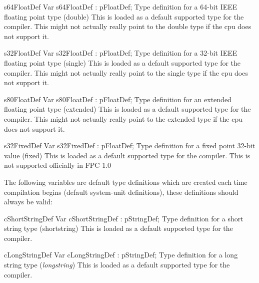 \documentclass [a4paper,12pt]{article}
\begin{document}
\begin{variable}{s64FloatDef}
\Declaration
Var s64FloatDef : pFloatDef;
\Description
Type definition for a 64-bit IEEE floating point type (\textsf{double})
\Notes
This is loaded as a default supported type for the compiler. This might not
actually really point to the double type if the cpu does not support it.
\end{variable}

\begin{variable}{s32FloatDef}
\Declaration
Var s32FloatDef : pFloatDef;
\Description
Type definition for a 32-bit IEEE floating point type (\textsf{single})
\Notes
This is loaded as a default supported type for the compiler. This might not
actually really point to the single type if the cpu does not support it.
\end{variable}

\begin{variable}{s80FloatDef}
\Declaration
Var s80FloatDef : pFloatDef;
\Description
Type definition for an extended floating point type (\textsf{extended})
\Notes
This is loaded as a default supported type for the compiler. This
might not actually really point to the extended type if the cpu does not
support it.
\end{variable}

\begin{variable}{s32FixedDef}
\Declaration
Var s32FixedDef : pFloatDef;
\Description
Type definition for a fixed point 32-bit value (\textsf{fixed})
\Notes
This is loaded as a default supported type for the compiler. This is
not supported officially in FPC 1.0
\end{variable}

The following variables are default type definitions which are created each
time compilation begins (default system-unit definitions), these definitions
should always be valid:

\begin{variable}{cShortStringDef}
\Declaration
Var cShortStringDef : pStringDef;
\Description
Type definition for a short string type (\textsf{shortstring})
\Notes
This is loaded as a default supported type for the compiler.
\end{variable}

\begin{variable}{cLongStringDef}
\Declaration
Var cLongStringDef : pStringDef;
\Description
Type definition for a long string type (\textsf{\textit{longstring}})
\Notes
This is loaded as a default supported type for the compiler.
\end{variable}
\end{document}
